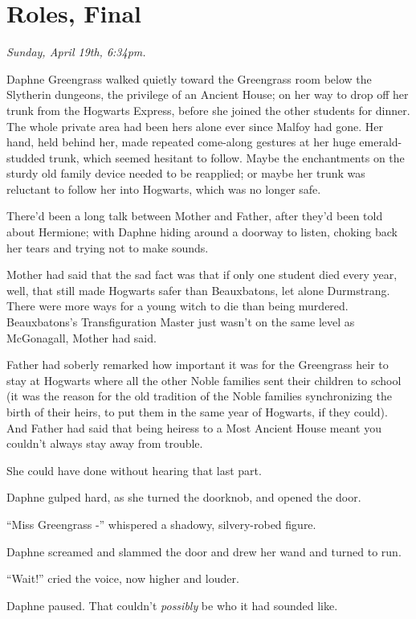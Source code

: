 \chapter{Roles, Final}

\emph{Sunday, April 19th, 6:34pm.}

Daphne Greengrass walked quietly toward the Greengrass room below the
Slytherin dungeons, the privilege of an Ancient House; on her way to
drop off her trunk from the Hogwarts Express, before she joined the
other students for dinner. The whole private area had been hers alone
ever since Malfoy had gone. Her hand, held behind her, made repeated
come-along gestures at her huge emerald-studded trunk, which seemed
hesitant to follow. Maybe the enchantments on the sturdy old family
device needed to be reapplied; or maybe her trunk was reluctant to
follow her into Hogwarts, which was no longer safe.

There'd been a long talk between Mother and Father, after they'd been
told about Hermione; with Daphne hiding around a doorway to listen,
choking back her tears and trying not to make sounds.

Mother had said that the sad fact was that if only one student died
every year, well, that still made Hogwarts safer than Beauxbatons, let
alone Durmstrang. There were more ways for a young witch to die than
being murdered. Beauxbatons's Transfiguration Master just wasn't on the
same level as McGonagall, Mother had said.

Father had soberly remarked how important it was for the Greengrass heir
to stay at Hogwarts where all the other Noble families sent their
children to school (it was the reason for the old tradition of the Noble
families synchronizing the birth of their heirs, to put them in the same
year of Hogwarts, if they could). And Father had said that being heiress
to a Most Ancient House meant you couldn't always stay away from
trouble.

She could have done without hearing that last part.

Daphne gulped hard, as she turned the doorknob, and opened the door.

``Miss Greengrass -'' whispered a shadowy, silvery-robed figure.

Daphne screamed and slammed the door and drew her wand and turned to
run.

``Wait!'' cried the voice, now higher and louder.

Daphne paused. That couldn't \emph{possibly} be who it had sounded like.

